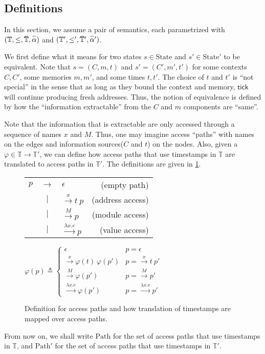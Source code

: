 \documentclass{article}
\theoremstyle{definition}
\def\ovbarw{1.2mu}
\def\ovbarh{1}
\newcommand*{\ovbar}[1]{\mkern \ovbarw\overline{\mkern-\ovbarw{\smash{#1}\scalebox{1}[\ovbarh]{\vphantom{i}}}\mkern-\ovbarw}\mkern \ovbarw}
\newcommand*{\A}[1]{\ovbar{#1}}
\newcommand*{\Time}{\mathbb{T}}
\newcommand*{\ATime}{\A{\Time}}
\newcommand*{\mem}{m}
\newcommand*{\State}{\text{State}}
\newcommand*{\Path}{\text{Path}}
\newcommand*{\tick}{\mathsf{tick}}
\begin{document}
\subsection{Definitions}
In this section, we assume a pair of semantics, each parametrized with $(\Time,\le,\ATime,\A\alpha)$ and $(\Time',\le',\ATime',\A\alpha')$.

We first define what it means for two states $s\in\State$ and $s'\in\State'$ to be equivalent.
Note that $s=(C,\mem,t)$ and $s'=(C',\mem',t')$ for some contexts $C,C'$, some memories $\mem,\mem'$, and some times $t,t'$.
The choice of $t$ and $t'$ is ``not special'' in the sense that as long as they bound the context and memory, $\tick$ will continue producing fresh addresses.
Thus, the notion of equivalence is defined by how the ``information extractable'' from the $C$ and $\mem$ components are ``same''.

Note that the information that is extractable are only accessed through a sequence of names $x$ and $M$.
Thus, one may imagine access ``paths'' with names on the edges and information sources($C$ and $t$) on the nodes.
Also, given a $\varphi\in\Time\rightarrow\Time'$, we can define how access paths that use timestamps in $\Time$ are translated to access paths in $\Time'$.
The definitions are given in \ref{fig:accpath}.
\begin{figure}[h!]
  \centering
  \begin{tabular}{rclr}
    $p$ & $\rightarrow$ & $\epsilon$                   & (empty path)     \\
        & $|$           & $\xrightarrow{x}t\:p$        & (address access) \\
        & $|$           & $\xrightarrow{M}p$           & (module access)  \\
        & $|$           & $\xrightarrow{\lambda x.e}p$ & (value access)
  \end{tabular}\:
  $
    \varphi(p)\triangleq
    \begin{cases}
      \epsilon                               & p=\epsilon                    \\
      \xrightarrow{x}\varphi(t)\:\varphi(p') & p=\xrightarrow{x}t\:p'        \\
      \xrightarrow{M}\varphi(p')             & p=\xrightarrow{M}p'           \\
      \xrightarrow{\lambda x.e}\varphi(p')   & p=\xrightarrow{\lambda x.e}p'
    \end{cases}
  $
  \caption{Definition for access paths and how translation of timestamps are mapped over access paths.}
  \label{fig:accpath}
\end{figure}
From now on, we shall write $\Path$ for the set of access paths that use timestamps in $\Time$, and $\Path'$ for the set of access paths that use timestamps in $\Time'$.
\end{document}
